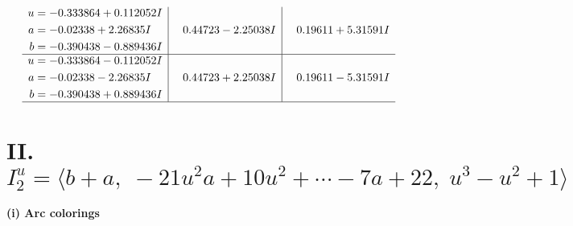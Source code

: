 \documentclass[1p]{elsarticle_modified}
\theoremstyle{definition}
\begin{document}
$$\begin{array}{c|c|c}
\begin{aligned}
u &= -0.333864 + 0.112052 I \\
a &= -0.02338 + 2.26835 I \\
b &= -0.390438 - 0.889436 I\end{aligned}
 & \phantom{-}0.44723 - 2.25038 I & \phantom{-}0.19611 + 5.31591 I \\ \hline\begin{aligned}
u &= -0.333864 - 0.112052 I \\
a &= -0.02338 - 2.26835 I \\
b &= -0.390438 + 0.889436 I\end{aligned}
 & \phantom{-}0.44723 + 2.25038 I & \phantom{-}0.19611 - 5.31591 I\\
 \hline 
 \end{array}$$\newpage\newpage\renewcommand{\arraystretch}{1}
\centering \section*{II. $I^u_{2}= \langle b+a,\;-21 u^2 a+10 u^2+\cdots-7 a+22,\;u^3- u^2+1 \rangle$}
\flushleft \textbf{(i) Arc colorings}\\
\end{document}
